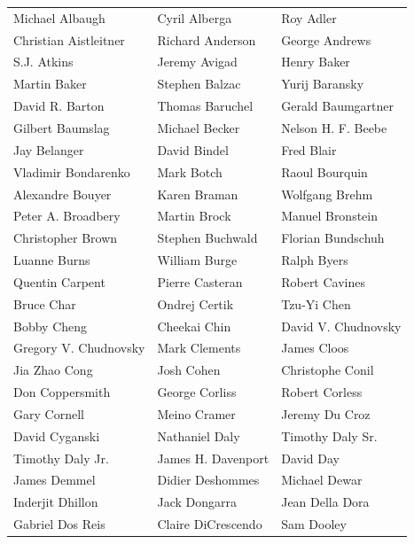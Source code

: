 \begin{tabular}{lll}
Michael Albaugh        & Cyril Alberga          & Roy Adler\\
Christian Aistleitner  & Richard Anderson       & George Andrews\\
S.J. Atkins            & Jeremy Avigad          & Henry Baker\\
Martin Baker           & Stephen Balzac         & Yurij Baransky\\
David R. Barton        & Thomas Baruchel        & Gerald Baumgartner\\
Gilbert Baumslag       & Michael Becker         & Nelson H. F. Beebe\\
Jay Belanger           & David Bindel           & Fred Blair\\
Vladimir Bondarenko    & Mark Botch             & Raoul Bourquin\\
Alexandre Bouyer       & Karen Braman           & Wolfgang Brehm\\
Peter A. Broadbery     & Martin Brock           & Manuel Bronstein\\
Christopher Brown      & Stephen Buchwald       & Florian Bundschuh\\
Luanne Burns           & William Burge          & Ralph Byers\\
Quentin Carpent        & Pierre Casteran        & Robert Cavines\\
Bruce Char             & Ondrej Certik          & Tzu-Yi Chen\\
Bobby Cheng            & Cheekai Chin           & David V. Chudnovsky\\
Gregory V. Chudnovsky  & Mark Clements          & James Cloos\\
Jia Zhao Cong          & Josh Cohen             & Christophe Conil\\
Don Coppersmith        & George Corliss         & Robert Corless\\
Gary Cornell           & Meino Cramer           & Jeremy Du Croz\\
David Cyganski         & Nathaniel Daly         & Timothy Daly Sr.\\
Timothy Daly Jr.       & James H. Davenport     & David Day\\
James Demmel           & Didier Deshommes       & Michael Dewar\\
Inderjit Dhillon       & Jack Dongarra          & Jean Della Dora\\
Gabriel Dos Reis       & Claire DiCrescendo     & Sam Dooley\\

\end{tabular}
